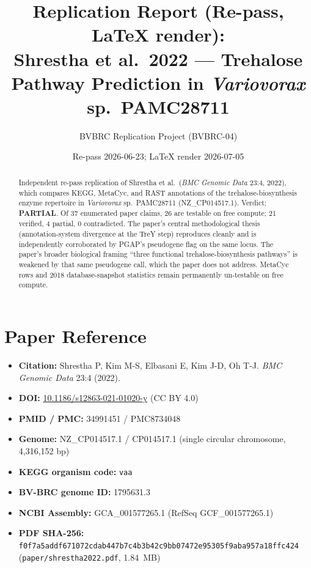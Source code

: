 \documentclass[11pt,letterpaper]{article}
\title{Replication Report (Re-pass, LaTeX render):\\
Shrestha et al.\ 2022 --- Trehalose Pathway Prediction in \textit{Variovorax} sp.\ PAMC28711}
\author{BVBRC Replication Project (BVBRC-04)}
\date{Re-pass 2026-06-23; LaTeX render 2026-07-05}
\begin{document}
\maketitle

\begin{abstract}
Independent re-pass replication of Shrestha et al.\ (\textit{BMC Genomic Data} 23:4, 2022),
which compares KEGG, MetaCyc, and RAST annotations of the trehalose-biosynthesis
enzyme repertoire in \textit{Variovorax} sp.\ PAMC28711 (NZ\_CP014517.1). Verdict:
\textbf{PARTIAL}. Of 37 enumerated paper claims, 26 are testable on free
compute; 21 verified, 4 partial, 0 contradicted. The paper's central methodological
thesis (annotation-system divergence at the TreY step) reproduces cleanly and is
independently corroborated by PGAP's pseudogene flag on the same locus. The
paper's broader biological framing ``three functional trehalose-biosynthesis
pathways'' is weakened by that same pseudogene call, which the paper does not
address. MetaCyc rows and 2018 database-snapshot statistics remain permanently
un-testable on free compute.
\end{abstract}

\section{Paper Reference}
\begin{itemize}[leftmargin=1.2em,itemsep=1pt]
  \item \textbf{Citation:} Shrestha P, Kim M-S, Elbasani E, Kim J-D, Oh T-J.
    \textit{BMC Genomic Data} 23:4 (2022).
  \item \textbf{DOI:} \href{https://doi.org/10.1186/s12863-021-01020-y}{10.1186/s12863-021-01020-y} (CC BY 4.0)
  \item \textbf{PMID / PMC:} 34991451 / PMC8734048
  \item \textbf{Genome:} NZ\_CP014517.1 / CP014517.1 (single circular chromosome, 4{,}316{,}152 bp)
  \item \textbf{KEGG organism code:} \texttt{vaa}
  \item \textbf{BV-BRC genome ID:} 1795631.3
  \item \textbf{NCBI Assembly:} GCA\_001577265.1 (RefSeq GCF\_001577265.1)
  \item \textbf{PDF SHA-256:} \texttt{f0f7a5addf671072cdab447b7c4b3b42c9bb07472e95305f9aba957a18ffc424}
    (\texttt{paper/shrestha2022.pdf}, 1.84~MB)
\end{itemize}
\end{document}
